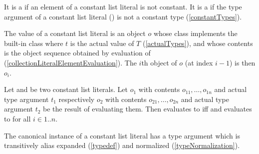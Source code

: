 \documentclass[makeidx]{article}
\begin{document}
{

\LMHash{}%
It is a 
if an element of a constant list literal is not constant.
It is a  if the type argument of a constant list literal
()
is not a constant type
(\ref{constantTypes}).


\LMHash{}%
The value of a constant list literal
is an object $o$ whose class implements the built-in class
where $t$ is the actual value of $T$
(\ref{actualTypes}),
and whose contents is the object sequence  obtained by
evaluation of 
(\ref{collectionLiteralElementEvaluation}).
The $i$th object of $o$ (at index $i - 1$) is then $o_i$.

\LMHash{}%
Let 
and 
be two constant list literals.
Let $o_1$ with contents $o_{11}, \ldots, o_{1n}$ and actual type argument $t_1$
respectively
$o_2$ with contents $o_{21}, \ldots, o_{2n}$ and actual type argument $t_2$
be the result of evaluating them.
Then  evaluates to \TRUE{} if{}f
 and 
evaluates to \TRUE{} for all $i \in 1 .. n$.


\LMHash{}%
The canonical instance of a constant list literal has a type argument
which is transitively alias expanded
(\ref{typedef})
and normalized
(\ref{typeNormalization}).

}
\end{document}
